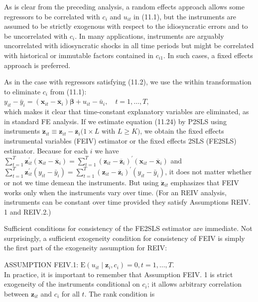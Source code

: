 \documentclass[10pt]{article}
\begin{document}
As is clear from the preceding analysis, a random effects approach allows some regressors to be correlated with $c_{i}$ and $u_{i t}$ in (11.1), but the instruments are assumed to be strictly exogenous with respect to the idiosyncratic errors and to be uncorrelated with $c_{i}$. In many applications, instruments are arguably uncorrelated with idiosyncratic shocks in all time periods but might be correlated with historical or immutable factors contained in $c_{i 1}$. In such cases, a fixed effects approach is preferred.

As in the case with regressors satisfying (11.2), we use the within transformation to eliminate $c_{i}$ from (11.1):\\
$y_{i t}-\bar{y}_{i}=\left(\mathbf{x}_{i t}-\overline{\mathbf{x}}_{i}\right) \boldsymbol{\beta}+u_{i t}-\bar{u}_{i}, \quad t=1, \ldots, T$,\\
which makes it clear that time-constant explanatory variables are eliminated, as in standard FE analysis. If we estimate equation (11.24) by P2SLS using instruments $\ddot{\mathbf{z}}_{i t} \equiv \mathbf{z}_{i t}-\overline{\mathbf{z}}_{i}(1 \times L$ with $L \geq K)$, we obtain the fixed effects instrumental variables (FEIV) estimator or the fixed effects 2SLS (FE2SLS) estimator. Because for each $i$ we have $\sum_{t=1}^{T} \mathbf{z}_{i t}^{\prime}\left(\mathbf{x}_{i t}-\overline{\mathbf{x}}_{i}\right)=\sum_{t=1}^{T}\left(\mathbf{z}_{i t}-\overline{\mathbf{z}}_{i}\right)^{\prime}\left(\mathbf{x}_{i t}-\overline{\mathbf{x}}_{i}\right)$ and $\sum_{t=1}^{T} \mathbf{z}_{i t}^{\prime}\left(y_{i t}-\bar{y}_{i}\right)= \sum_{t=1}^{T}\left(\mathbf{z}_{i t}-\overline{\mathbf{z}}_{i}\right)^{\prime}\left(y_{i t}-\bar{y}_{i}\right)$, it does not matter whether or not we time demean the instruments. But using $\ddot{\mathbf{z}}_{i t}$ emphasizes that FEIV works only when the instruments vary over time. (For an REIV analysis, instruments can be constant over time provided they satisfy Assumptions REIV. 1 and REIV.2.)

Sufficient conditions for consistency of the FE2SLS estimator are immediate. Not surprisingly, a sufficient exogeneity condition for consistency of FEIV is simply the first part of the exogeneity assumption for REIV:

ASSUMPTION FEIV.1: $\mathrm{E}\left(u_{i t} \mid \mathbf{z}_{i}, c_{i}\right)=0, t=1, \ldots, T$.\\
In practice, it is important to remember that Assumption FEIV. 1 is strict exogeneity of the instruments conditional on $c_{i}$; it allows arbitrary correlation between $\mathbf{z}_{i t}$ and $c_{i}$ for all $t$. The rank condition is
\end{document}
